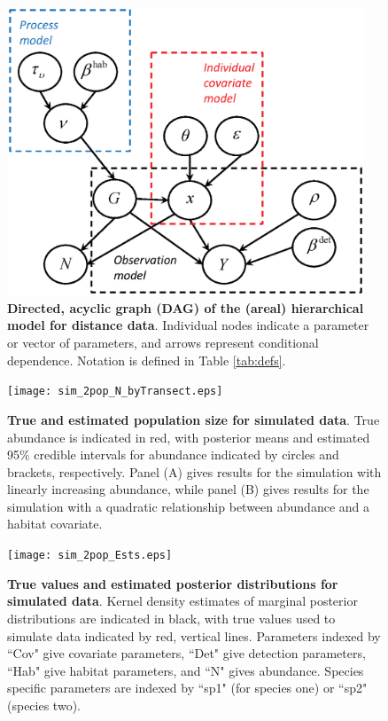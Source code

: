 \documentclass[10pt]{article}
\begin{document}
\begin{figure}
\begin{center}
\includegraphics[width=0.95\textwidth]{DAG_simple.eps}
\end{center}
\caption{{\bf Directed, acyclic graph (DAG) of the (areal) hierarchical model
for distance data}. Individual nodes indicate a parameter or vector of parameters, and arrows represent conditional dependence. Notation is defined in Table \ref{tab:defs}.}
\label{fig:DAG}
\end{figure}
\clearpage

\begin{figure}
\begin{center}
\texttt{[image: sim\_2pop\_N\_byTransect.eps]}
\end{center}
\caption{{\bf True and estimated population size for simulated data}. True abundance is indicated in red, with posterior means and estimated 95\% credible intervals for abundance indicated by circles and brackets, respectively.  Panel (A) gives results for the simulation with linearly increasing abundance, while panel (B) gives results for the simulation with a quadratic relationship between abundance and a habitat covariate.}
\label{fig:sim_N}
\end{figure}
\clearpage

\begin{figure}
\begin{center}
\texttt{[image: sim\_2pop\_Ests.eps]}
\end{center}
\caption{{\bf True values and estimated posterior distributions for simulated data}. Kernel density estimates of marginal posterior distributions are indicated in black, with true values used to simulate data indicated by red, vertical lines.  Parameters indexed by ``Cov" give covariate parameters, ``Det" give detection parameters, ``Hab" give habitat parameters, and ``N" gives abundance.  Species specific parameters are indexed by ``sp1" (for species one) or ``sp2" (species two). }
\label{fig:sim_posts}
\end{figure}
\clearpage
\end{document}
